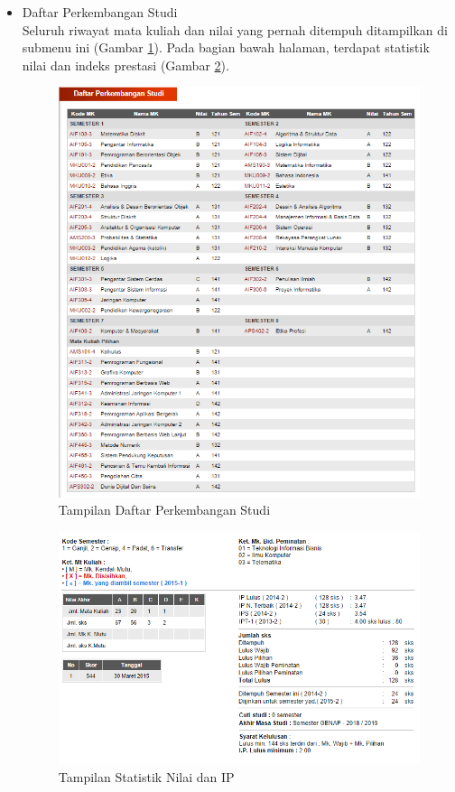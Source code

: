 \documentclass[a4paper,twoside]{article}
\begin{document}
\begin{enumerate}
\begin{enumerate}
\begin{enumerate}
\begin{itemize}
\begin{itemize}
			\item Daftar Perkembangan Studi \\
			Seluruh riwayat mata kuliah dan nilai yang pernah ditempuh ditampilkan di submenu ini (Gambar \ref{fig:3_pam_utama_dps}). Pada bagian bawah halaman, terdapat statistik nilai dan indeks prestasi (Gambar \ref{fig:3_pam_utama_dpsstat}). 
			\begin{figure}[H]
				\centering
				\includegraphics[scale=0.5]{Gambar/pam-utama-dps}
				\caption{Tampilan Daftar Perkembangan Studi} 
				\label{fig:3_pam_utama_dps}
			\end{figure}
			
			\begin{figure}[H]
				\centering
				\includegraphics[scale=0.5]{Gambar/pam-utama-dpsstat}
				\caption{Tampilan Statistik Nilai dan IP} 
				\label{fig:3_pam_utama_dpsstat}
			\end{figure}
			

\end{itemize}
\end{itemize}
\end{enumerate}
\end{enumerate}
\end{enumerate}
\end{document}
